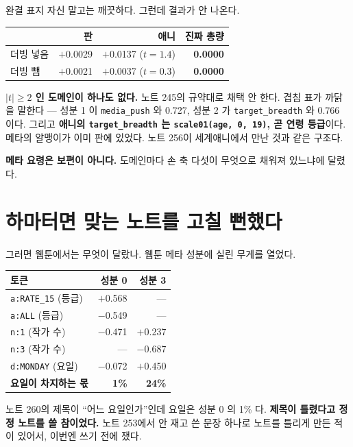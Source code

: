 \documentclass[10pt]{article}
\begin{document}
완결 표지 자신 말고는 깨끗하다. 그런데 결과가 안 나온다.

\begin{center}\small
\begin{tabular}{lrrr}
\hline
 & 판 & 애니 & 진짜 총량 \\
\hline
더빙 넣음 & $+$0.0029 & $+$0.0137 ($t{=}1.4$) & \textbf{0.0000} \\
더빙 뺌 & $+$0.0021 & $+$0.0037 ($t{=}0.3$) & \textbf{0.0000} \\
\hline
\end{tabular}
\end{center}

\textbf{$|t| \ge 2$ 인 도메인이 하나도 없다.} 노트 245의 규약대로 채택 안
한다. 겹침 표가 까닭을 말한다 --- 성분 1 이 \texttt{media\_push} 와 0.727,
성분 2 가 \texttt{target\_breadth} 와 0.766 이다. 그리고 \textbf{애니의
\texttt{target\_breadth} 는 \texttt{scale01(age, 0, 19)}, 곧 연령 등급}이다.
메타의 알맹이가 이미 판에 있었다. 노트 256이 세계애니에서 만난 것과 같은
구조다.

\textbf{메타 요령은 보편이 아니다.} 도메인마다 손 축 다섯이 무엇으로 채워져
있느냐에 달렸다.

\section{하마터면 맞는 노트를 고칠 뻔했다}

그러면 웹툰에서는 무엇이 달랐나. 웹툰 메타 성분에 실린 무게를 열었다.

\begin{center}\small
\begin{tabular}{lrr}
\hline
토큰 & 성분 0 & 성분 3 \\
\hline
\texttt{a:RATE\_15} (등급) & $+$0.568 & --- \\
\texttt{a:ALL} (등급) & $-$0.549 & --- \\
\texttt{n:1} (작가 수) & $-$0.471 & $+$0.237 \\
\texttt{n:3} (작가 수) & --- & $-$0.687 \\
\texttt{d:MONDAY} (요일) & $-$0.072 & $+$0.450 \\
\hline
\textbf{요일이 차지하는 몫} & \textbf{1\%} & \textbf{24\%} \\
\hline
\end{tabular}
\end{center}

노트 260의 제목이 ``어느 요일인가''인데 요일은 성분 0 의 1\% 다. \textbf{제목이
틀렸다고 정정 노트를 쓸 참이었다.} 노트 253에서 안 재고 쓴 문장 하나로
노트를 틀리게 만든 적이 있어서, 이번엔 쓰기 전에 쟀다.
\end{document}

